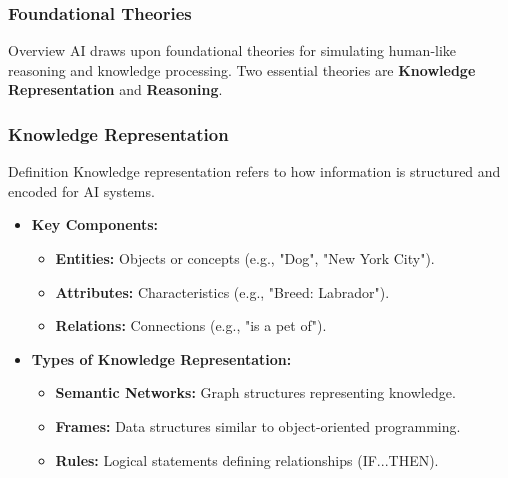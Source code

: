 \documentclass[aspectratio=169]{beamer}
\begin{document}
\begin{frame}[fragile]
    \frametitle{Foundational Theories}
    \begin{block}{Overview}
        AI draws upon foundational theories for simulating human-like reasoning and knowledge processing.
        Two essential theories are \textbf{Knowledge Representation} and \textbf{Reasoning}.
    \end{block}
\end{frame}

\begin{frame}[fragile]
    \frametitle{Knowledge Representation}
    \begin{block}{Definition}
        Knowledge representation refers to how information is structured and encoded for AI systems.
    \end{block}
    \begin{itemize}
        \item \textbf{Key Components:}
        \begin{itemize}
            \item \textbf{Entities:} Objects or concepts (e.g., "Dog", "New York City").
            \item \textbf{Attributes:} Characteristics (e.g., "Breed: Labrador").
            \item \textbf{Relations:} Connections (e.g., "is a pet of").
        \end{itemize}
    
        \item \textbf{Types of Knowledge Representation:}
        \begin{itemize}
            \item \textbf{Semantic Networks:} Graph structures representing knowledge.
            \item \textbf{Frames:} Data structures similar to object-oriented programming.
            \item \textbf{Rules:} Logical statements defining relationships (IF...THEN).
        \end{itemize}
    \end{itemize}
\end{frame}
\end{document}

